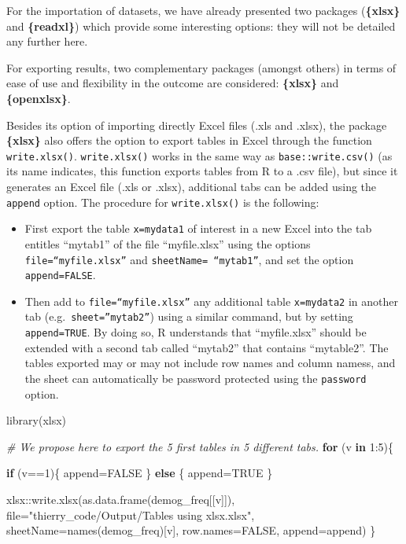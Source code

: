 \documentclass[
]{book}
\newenvironment{Shaded}{\begin{snugshade}}{\end{snugshade}}
\newcommand{\AttributeTok}[1]{\textcolor[rgb]{0.77,0.63,0.00}{#1}}
\newcommand{\CommentTok}[1]{\textcolor[rgb]{0.56,0.35,0.01}{\textit{#1}}}
\newcommand{\ConstantTok}[1]{\textcolor[rgb]{0.00,0.00,0.00}{#1}}
\newcommand{\ControlFlowTok}[1]{\textcolor[rgb]{0.13,0.29,0.53}{\textbf{#1}}}
\newcommand{\DecValTok}[1]{\textcolor[rgb]{0.00,0.00,0.81}{#1}}
\newcommand{\FunctionTok}[1]{\textcolor[rgb]{0.00,0.00,0.00}{#1}}
\newcommand{\NormalTok}[1]{#1}
\newcommand{\OtherTok}[1]{\textcolor[rgb]{0.56,0.35,0.01}{#1}}
\newcommand{\SpecialCharTok}[1]{\textcolor[rgb]{0.00,0.00,0.00}{#1}}
\newcommand{\StringTok}[1]{\textcolor[rgb]{0.31,0.60,0.02}{#1}}
\providecommand{\tightlist}{%
  \setlength{\itemsep}{0pt}\setlength{\parskip}{0pt}}
\begin{document}
For the importation of datasets, we have already presented two packages (\textbf{\{xlsx\}} and \textbf{\{readxl\}}) which provide some interesting options: they will not be detailed any further here.

For exporting results, two complementary packages (amongst others) in terms of ease of use and flexibility in the outcome are considered: \textbf{\{xlsx\}} and \textbf{\{openxlsx\}}.

Besides its option of importing directly Excel files (.xls and .xlsx), the package \textbf{\{xlsx\}} also offers the option to export tables in Excel through the function \texttt{write.xlsx()}. \texttt{write.xlsx()} works in the same way as \texttt{base::write.csv()} (as its name indicates, this function exports tables from R to a .csv file), but since it generates an Excel file (.xls or .xlsx), additional tabs can be added using the \texttt{append} option. The procedure for \texttt{write.xlsx()} is the following:

\begin{itemize}
\tightlist
\item
  First export the table \texttt{x=mydata1} of interest in a new Excel into the tab entitles ``mytab1'' of the file ``myfile.xlsx'' using the options \texttt{file=“myfile.xlsx”} and \texttt{sheetName=\ “mytab1”}, and set the option \texttt{append=FALSE}.
\item
  Then add to \texttt{file=“myfile.xlsx”} any additional table \texttt{x=mydata2} in another tab (e.g.~\texttt{sheet=”mytab2”}) using a similar command, but by setting \texttt{append=TRUE}.
  By doing so, R understands that ``myfile.xlsx'' should be extended with a second tab called ``mytab2'' that contains ``mytable2''. The tables exported may or may not include row names and column namess, and the sheet can automatically be password protected using the \texttt{password} option.
\end{itemize}

\begin{Shaded}
\begin{Highlighting}[]
\FunctionTok{library}\NormalTok{(xlsx)}

\CommentTok{\# We propose here to export the 5 first tables in 5 different tabs.}
\ControlFlowTok{for}\NormalTok{ (v }\ControlFlowTok{in} \DecValTok{1}\SpecialCharTok{:}\DecValTok{5}\NormalTok{)\{}
  
  \ControlFlowTok{if}\NormalTok{ (v}\SpecialCharTok{==}\DecValTok{1}\NormalTok{)\{}
\NormalTok{    append}\OtherTok{=}\ConstantTok{FALSE}
\NormalTok{  \} }\ControlFlowTok{else}\NormalTok{ \{}
\NormalTok{    append}\OtherTok{=}\ConstantTok{TRUE}
\NormalTok{  \}}
  
\NormalTok{  xlsx}\SpecialCharTok{::}\FunctionTok{write.xlsx}\NormalTok{(}\FunctionTok{as.data.frame}\NormalTok{(demog\_freq[[v]]), }
                   \AttributeTok{file=}\StringTok{"thierry\_code/Output/Tables using xlsx.xlsx"}\NormalTok{, }
                   \AttributeTok{sheetName=}\FunctionTok{names}\NormalTok{(demog\_freq)[v], }
                   \AttributeTok{row.names=}\ConstantTok{FALSE}\NormalTok{, }\AttributeTok{append=}\NormalTok{append)}
\NormalTok{\}}
\end{Highlighting}
\end{Shaded}
\end{document}
